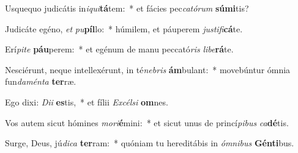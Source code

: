 \item Usquequo judicátis in\textit{i}\textit{qui}\textbf{tá}tem:~* et fácies pec\textit{ca}\textit{tó}\textit{rum} \textbf{sú}\textbf{mi}tis?
\item Judicáte egéno, \textit{et} \textit{pu}\textbf{píl}lo:~* húmilem, et páuperem \textit{jus}\textit{ti}\textit{fi}\textbf{cá}te.
\item Erí\textit{pi}\textit{te} \textbf{páu}perem:~* et egénum de manu peccató\textit{ris} \textit{li}\textit{be}\textbf{rá}te.
\item Nesciérunt, neque intellexérunt, in té\textit{ne}\textit{bris} \textbf{ám}bulant:~* movebúntur ómnia fun\textit{da}\textit{mén}\textit{ta} \textbf{ter}ræ.
\item Ego dixi: \textit{Di}\textit{i} \textbf{es}tis,~* et fílii \textit{Ex}\textit{cél}\textit{si} \textbf{om}nes.
\item Vos autem sicut hómines \textit{mo}\textit{ri}\textbf{é}mini:~* et sicut unus de princí\textit{pi}\textit{bus} \textit{ca}\textbf{dé}tis.
\item Surge, Deus, jú\textit{di}\textit{ca} \textbf{ter}ram:~* quóniam tu hereditábis in \textit{óm}\textit{ni}\textit{bus} \textbf{Gén}\textbf{ti}bus.
